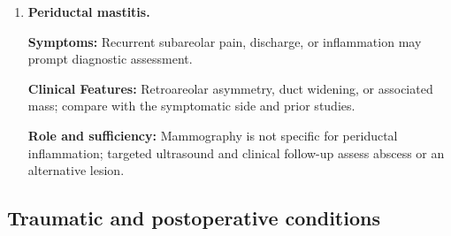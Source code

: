 \begin{enumerate}[leftmargin=*,itemsep=0.45em,topsep=0.4em]
\item \textbf{Periductal mastitis.}\par\noindent\textbf{Symptoms:} Recurrent subareolar pain, discharge, or inflammation may prompt diagnostic assessment.\par\noindent\textbf{Clinical Features:} Retroareolar asymmetry, duct widening, or associated mass; compare with the symptomatic side and prior studies.\par\noindent\textbf{Role and sufficiency:} Mammography is not specific for periductal inflammation; targeted ultrasound and clinical follow-up assess abscess or an alternative lesion.
\end{enumerate}

\subsection{Traumatic and postoperative conditions}
